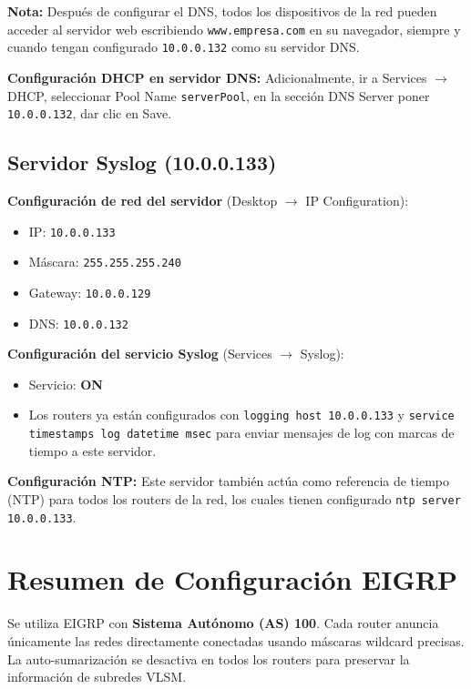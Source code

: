 \documentclass[letterpaper,11pt]{article}
\begin{document}
\textbf{Nota:} Después de configurar el DNS, todos los dispositivos de la red pueden acceder al servidor web escribiendo \texttt{www.empresa.com} en su navegador, siempre y cuando tengan configurado \texttt{10.0.0.132} como su servidor DNS.

\textbf{Configuración DHCP en servidor DNS:} Adicionalmente, ir a Services $\rightarrow$ DHCP, seleccionar Pool Name \texttt{serverPool}, en la sección DNS Server poner \texttt{10.0.0.132}, dar clic en Save.

\subsection{Servidor Syslog (10.0.0.133)}

\textbf{Configuración de red del servidor} (Desktop $\rightarrow$ IP Configuration):
\begin{itemize}
    \item IP: \texttt{10.0.0.133}
    \item Máscara: \texttt{255.255.255.240}
    \item Gateway: \texttt{10.0.0.129}
    \item DNS: \texttt{10.0.0.132}
\end{itemize}

\textbf{Configuración del servicio Syslog} (Services $\rightarrow$ Syslog):
\begin{itemize}
    \item Servicio: \textbf{ON}
    \item Los routers ya están configurados con \texttt{logging host 10.0.0.133} y \texttt{service timestamps log datetime msec} para enviar mensajes de log con marcas de tiempo a este servidor.
\end{itemize}

\textbf{Configuración NTP:} Este servidor también actúa como referencia de tiempo (NTP) para todos los routers de la red, los cuales tienen configurado \texttt{ntp server 10.0.0.133}.

\section{Resumen de Configuración EIGRP}

Se utiliza EIGRP con \textbf{Sistema Autónomo (AS) 100}. Cada router anuncia únicamente las redes directamente conectadas usando máscaras wildcard precisas. La auto-sumarización se desactiva en todos los routers para preservar la información de subredes VLSM.
\end{document}
